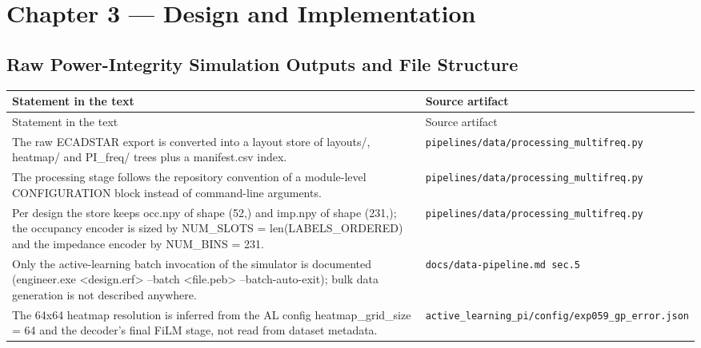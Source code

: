 \section{Chapter 3 --- Design and Implementation}
\label{sec:appD_ch3}

\subsection*{Raw Power-Integrity Simulation Outputs and File Structure}
\begingroup\small
\begin{longtable}{p{} p{}}
\hline
Statement in the text & Source artifact \\
\hline
\endfirsthead
\hline
Statement in the text & Source artifact \\
\hline
\endhead
The raw ECADSTAR export is converted into a layout store of layouts/, heatmap/ and PI\_freq/ trees plus a manifest.csv index. & \texttt{pipelines/\allowbreak{}data/\allowbreak{}processing\_\allowbreak{}multifreq.py} \\
The processing stage follows the repository convention of a module-level CONFIGURATION block instead of command-line arguments. & \texttt{pipelines/\allowbreak{}data/\allowbreak{}processing\_\allowbreak{}multifreq.py} \\
Per design the store keeps occ.npy of shape (52,) and imp.npy of shape (231,); the occupancy encoder is sized by NUM\_SLOTS = len(LABELS\_ORDERED) and the impedance encoder by NUM\_BINS = 231. & \texttt{pipelines/\allowbreak{}data/\allowbreak{}processing\_\allowbreak{}multifreq.py} \\
Only the active-learning batch invocation of the simulator is documented (engineer.exe <design.erf> --batch <file.peb> --batch-auto-exit); bulk data generation is not described anywhere. & \texttt{docs/\allowbreak{}data-pipeline.md sec.5} \\
The 64x64 heatmap resolution is inferred from the AL config heatmap\_grid\_size = 64 and the decoder's final FiLM stage, not read from dataset metadata. & \texttt{active\_\allowbreak{}learning\_\allowbreak{}pi/\allowbreak{}config/\allowbreak{}exp059\_\allowbreak{}gp\_\allowbreak{}error.json} \\
\hline
\end{longtable}
\endgroup

